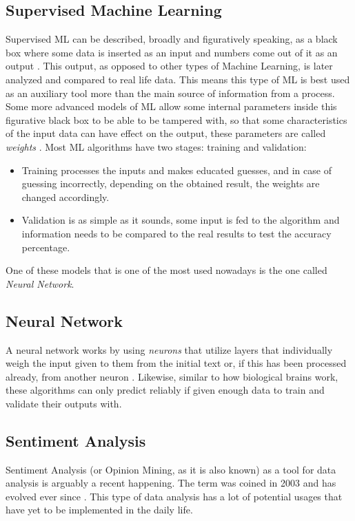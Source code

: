 \documentclass[review]{elsarticle} %
\begin{document}
\subsection{Supervised Machine Learning}
Supervised ML can be described, broadly and figuratively speaking, as a black box where some data is inserted as an input and numbers come out of it as an output \citep{rf8}. This output, as opposed to other types of Machine Learning, is later analyzed and compared to real life data. This means this type of ML is best used as an auxiliary tool more than the main source of information from a process.
Some more advanced models of ML allow some internal parameters inside this figurative black box to be able to be tampered with, so that some characteristics of the input data can have effect on the output, these parameters are called \textit{weights} \citep{rf9}.
Most ML algorithms have two stages: training and validation:
\begin{itemize}
\item Training processes the inputs and makes educated guesses, and in case of guessing incorrectly, depending on the obtained result, the weights are changed accordingly.
\item Validation is as simple as it sounds, some input is fed to the algorithm and information needs to be compared to the real results to test the accuracy percentage.
\end{itemize}
One of these models that is one of the most used nowadays is the one called \textit{Neural Network}.

\subsection{Neural Network}
A neural network works by using \textit{neurons} that utilize layers that individually weigh the input given to them from the initial text or, if this has been processed already, from another neuron \citep{rf9}.
Likewise, similar to how biological brains work, these algorithms can only predict reliably if given enough data to train and validate their outputs with.

\subsection{Sentiment Analysis}
Sentiment Analysis (or Opinion Mining, as it is also known) as a tool for data analysis is arguably a recent happening. The term was coined in 2003 and has evolved ever since \citep{rf3}.
This type of data analysis has a lot of potential usages that have yet to be implemented in the daily life.
\end{document}
